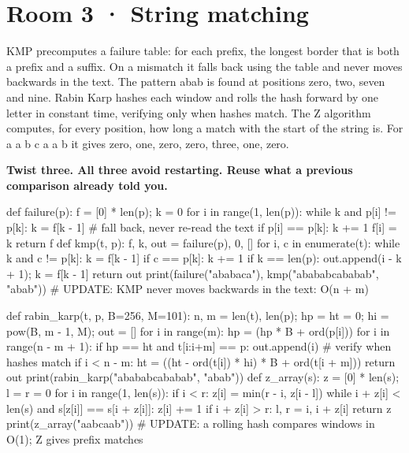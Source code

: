 \documentclass[11pt,a4paper]{report}
\begin{document}
\section*{Room 3 · String matching}
KMP precomputes a failure table: for each prefix, the longest border that is both a prefix and a suffix. On a mismatch it falls back using the table and never moves backwards in the text. The pattern abab is found at positions zero, two, seven and nine. Rabin Karp hashes each window and rolls the hash forward by one letter in constant time, verifying only when hashes match. The Z algorithm computes, for every position, how long a match with the start of the string is. For a a b c a a b it gives zero, one, zero, zero, three, one, zero.
\begin{tcolorbox}[colback=yellow!12,colframe=orange!70!black,boxrule=0.4pt,left=4pt,right=4pt,top=2pt,bottom=2pt]\textbf{Twist three. All three avoid restarting. Reuse what a previous comparison already told you.}\end{tcolorbox}
\begin{Code}
def failure(p):
    f = [0] * len(p); k = 0
    for i in range(1, len(p)):
        while k and p[i] != p[k]: k = f[k - 1]      # fall back, never re-read the text
        if p[i] == p[k]: k += 1
        f[i] = k
    return f
def kmp(t, p):
    f, k, out = failure(p), 0, []
    for i, c in enumerate(t):
        while k and c != p[k]: k = f[k - 1]
        if c == p[k]: k += 1
        if k == len(p): out.append(i - k + 1); k = f[k - 1]
    return out
print(failure("ababaca"), kmp("abababcababab", "abab"))
# UPDATE: KMP never moves backwards in the text: O(n + m)
\end{Code}
\begin{Out}
[0, 0, 1, 2, 3, 0, 1] [0, 2, 7, 9]
\end{Out}
\begin{Code}
def rabin_karp(t, p, B=256, M=101):
    n, m = len(t), len(p); hp = ht = 0; hi = pow(B, m - 1, M); out = []
    for i in range(m): hp = (hp * B + ord(p[i])) %
    for i in range(n - m + 1):
        if hp == ht and t[i:i+m] == p: out.append(i)      # verify when hashes match
        if i < n - m: ht = ((ht - ord(t[i]) * hi) * B + ord(t[i + m])) %
    return out
print(rabin_karp("abababcababab", "abab"))
def z_array(s):
    z = [0] * len(s); l = r = 0
    for i in range(1, len(s)):
        if i < r: z[i] = min(r - i, z[i - l])
        while i + z[i] < len(s) and s[z[i]] == s[i + z[i]]: z[i] += 1
        if i + z[i] > r: l, r = i, i + z[i]
    return z
print(z_array("aabcaab"))
# UPDATE: a rolling hash compares windows in O(1); Z gives prefix matches
\end{Code}
\begin{Out}
[0, 2, 7, 9]
[0, 1, 0, 0, 3, 1, 0]
\end{Out}
\end{document}
